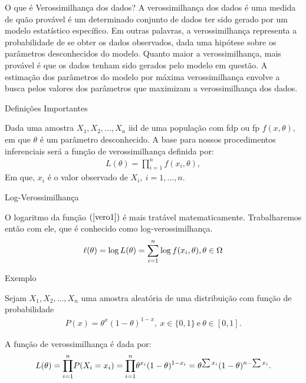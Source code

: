 \documentclass[12pt]{beamer}
\begin{document}
\begin{frame}{}
    \begin{block}{O que é Verossimilhança dos dados?}
    \justifying
A verossimilhança dos dados é uma medida de quão provável é um determinado conjunto de dados ter sido gerado por um modelo estatístico específico. Em outras palavras, a verossimilhança representa a probabilidade de se obter os dados observados, dada uma hipótese sobre os parâmetros desconhecidos do modelo. Quanto maior a verossimilhança, mais provável é que os dados tenham sido gerados pelo modelo em questão. A estimação dos parâmetros do modelo por máxima verossimilhança envolve a busca pelos valores dos parâmetros que maximizam a verossimilhança dos dados.
\end{block}
\end{frame}

\begin{frame}{Definições Importantes}
\begin{definicao}\label{def5}
    Dada uma amostra $X_1, X_2, ..., X_n$ iid de uma população com fdp ou fp $f(x,\theta),$ em que $\theta$ é um parâmetro desconhecido. A base para nossos procedimentos inferenciais será a função de verossimilhança definida por:
    \begin{align}\label{vero1}
    L(\theta)=\displaystyle{\prod_{i=1}^{n}f(x_{i},\theta)},
    \end{align}
Em que, $x_{i}$ é o valor observado de $X_{i},~i=1,\ldots, n.$
\end{definicao}
\end{frame}

\begin{frame}{Log-Verossimilhança}
\begin{block}{}
\justifying
O logaritmo da função $(\ref{vero1})$ é mais tratável matematicamente. Trabalharemos então com ele, que é conhecido como log-verossimilhança.
\begin{align*}
    \ell(\theta)=\log{L(\theta)}={\displaystyle \sum_{i=1}^{n}} \log{f(x_{i},\theta)},\theta\in \Omega
\end{align*}
\end{block}
\end{frame}

\begin{frame}{Exemplo}
\begin{block}{}
\justifying
Sejam $X_1, X_2, ..., X_n$ uma amostra aleatória de uma distribuição com função de probabilidade
\begin{align*}
    P(x)=\theta^{x}(1-\theta)^{1-x},~x\in\{0,1\}~\text{e}~\theta\in[0,1].
\end{align*}
\end{block}
\pause
\begin{block}{}
\justifying
A função de verossimilhança é dada por:
\begin{align*}
    L(\theta)={\displaystyle {\displaystyle \prod_{i=1}^{n}} P(X_{i}=x_{i})={\displaystyle \prod_{i=1}^{n}} \theta^{x_{i}}(1-\theta)^{1-x_{i}}}=\theta^{\sum x_{i}}(1-\theta)^{n-\sum x_{i}}.
\end{align*}
\end{block}
\end{frame}
\end{document}
